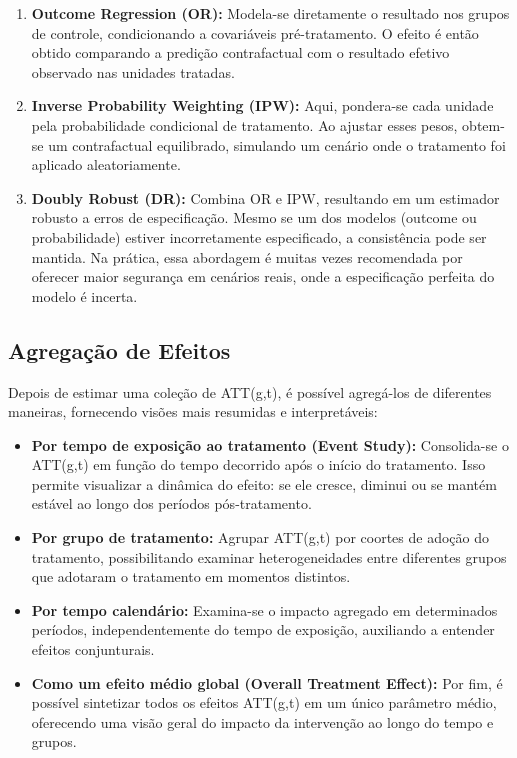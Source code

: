 \documentclass[
	12pt,				%
	openright,			%
	oneside,			%
	a4paper,			%
	english,			%
	french,				%
	spanish,			%
	brazil				%
	]{abntex2}
\begin{document}
\begin{enumerate}
\item \textbf{Outcome Regression (OR):} Modela-se diretamente o resultado nos grupos de controle, condicionando a covariáveis pré-tratamento. O efeito é então obtido comparando a predição contrafactual com o resultado efetivo observado nas unidades tratadas.

\item \textbf{Inverse Probability Weighting (IPW):} Aqui, pondera-se cada unidade pela probabilidade condicional de tratamento. Ao ajustar esses pesos, obtem-se um contrafactual equilibrado, simulando um cenário onde o tratamento foi aplicado aleatoriamente.

\item \textbf{Doubly Robust (DR):} Combina OR e IPW, resultando em um estimador robusto a erros de especificação. Mesmo se um dos modelos (outcome ou probabilidade) estiver incorretamente especificado, a consistência pode ser mantida. Na prática, essa abordagem é muitas vezes recomendada por oferecer maior segurança em cenários reais, onde a especificação perfeita do modelo é incerta.
\end{enumerate}

\subsection{Agregação de Efeitos}

Depois de estimar uma coleção de ATT(g,t), é possível agregá-los de diferentes maneiras, fornecendo visões mais resumidas e interpretáveis:

\begin{itemize}
\item \textbf{Por tempo de exposição ao tratamento (Event Study):} Consolida-se o ATT(g,t) em função do tempo decorrido após o início do tratamento. Isso permite visualizar a dinâmica do efeito: se ele cresce, diminui ou se mantém estável ao longo dos períodos pós-tratamento.

\item \textbf{Por grupo de tratamento:} Agrupar ATT(g,t) por coortes de adoção do tratamento, possibilitando examinar heterogeneidades entre diferentes grupos que adotaram o tratamento em momentos distintos.

\item \textbf{Por tempo calendário:} Examina-se o impacto agregado em determinados períodos, independentemente do tempo de exposição, auxiliando a entender efeitos conjunturais.

\item \textbf{Como um efeito médio global (Overall Treatment Effect):} Por fim, é possível sintetizar todos os efeitos ATT(g,t) em um único parâmetro médio, oferecendo uma visão geral do impacto da intervenção ao longo do tempo e grupos.
\end{itemize}
\end{document}
